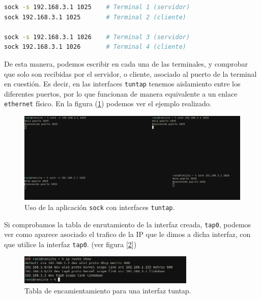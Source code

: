 \documentclass[a4paper, oneside, 12pt]{book}
\begin{document}
	\begin{lstlisting}[language=Bash, caption={Uso de aplicacion \texttt{sock} para crear cliente servidor asociado a un puerto}]
sock -s 192.168.3.1 1025    # Terminal 1 (servidor)
sock 192.168.3.1 1025       # Terminal 2 (cliente)

sock -s 192.168.3.1 1026    # Terminal 3 (servidor)
sock 192.168.3.1 1026       # Terminal 4 (cliente)
	\end{lstlisting}


	\noindent De esta manera, podemos escribir en cada una de las terminales, y comprobar que solo son recibidas por el servidor, o cliente, asociado al puerto de la terminal en cuestión. Es decir, en las interfaces \texttt{tuntap} tenemos aislamiento entre los diferentes puertos, por lo que funcionan de manera equivalente a un enlace \texttt{ethernet} físico. En la figura (\ref{img: ejemplo sock}) podemos ver el ejemplo realizado. \\
	
	\begin{figure}[h!]
		\begin{center}
			\includegraphics[width=1\textwidth]{img/ejemplo_sock.png}
			\caption{Uso de la aplicación \texttt{sock} con interfaces \texttt{tuntap}.}
			\label{img: ejemplo sock}
		\end{center}
	\end{figure}
	
	\noindent Si comprobamos la tabla de enrutamiento de la interfaz creada, \texttt{tap0}, podemos ver como aparece asociado el trafico de la IP que le dimos a dicha interfaz, con que utilice la interfaz \texttt{tap0}. (ver figura [\ref{img: ip route tap}])
	
	\begin{figure}[h!]
		\begin{center}
			\includegraphics[width=0.75\textwidth]{img/tabla_encaminamiento_tuntap.png}
			\caption{Tabla de encamientamiento para una interfaz tuntap.}
			\label{img: ip route tap}
		\end{center}
	\end{figure}
\end{document}
